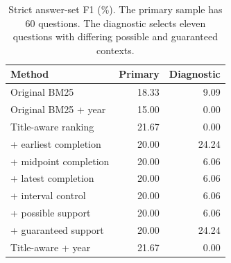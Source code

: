 \begin{table}[t]
\centering\small
\begin{tabular}{@{}lrr@{}}
\toprule
Method & Primary & Diagnostic\\
\midrule
Original BM25 & 18.33 & 9.09\\
Original BM25 + year & 15.00 & 0.00\\
Title-aware ranking & 21.67 & 0.00\\
\quad + earliest completion & 20.00 & 24.24\\
\quad + midpoint completion & 20.00 & 6.06\\
\quad + latest completion & 20.00 & 6.06\\
\quad + interval control & 20.00 & 6.06\\
\quad + possible support & 20.00 & 6.06\\
\quad + guaranteed support & 20.00 & 24.24\\
Title-aware + year & 21.67 & 0.00\\
\bottomrule
\end{tabular}
\caption{Strict answer-set F1 (\%). The primary sample has 60 questions. The diagnostic selects eleven questions with differing possible and guaranteed contexts.}
\label{tab:reader_main}
\end{table}
